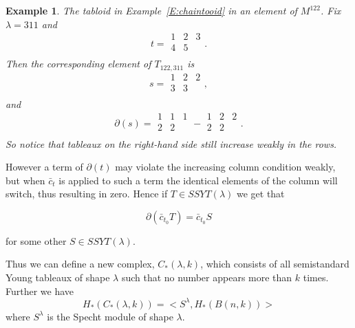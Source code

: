 \documentclass{elsart}
\newtheorem{example}[theorem]{Example}
\begin{document}
\begin{example}
  The tabloid in Example~\ref{E:chaintooid} in an element of $M^{122}$. Fix $\lambda=311$ and 
  $$t = \begin{array}{ccc} 1 & 2 & 3 \\ 4 & 5 & \\ \end{array} .$$ Then the corresponding element of $T_{122, 311}$ is
  $$s = \begin{array}{ccc} 1 & 2 & 2 \\ 3 & 3\\ \end{array} ,$$ and 
  $$\partial(s) = \begin{array}{ccc} 1 & 1 & 1\\ 2 & 2\\ \end{array}  - \begin{array}{ccc} 1 & 2 & 2 \\ 2 & 2\\ 
    \end{array} .$$
  So notice that tableaux on the right-hand side still increase weakly in the rows.
\end{example}

However a term of $\partial(t)$ may violate the
increasing column condition weakly, but when ${\bar c}_t$ is applied to such a term the 
identical elements of the column will switch, thus resulting in zero. Hence if $T \in SSYT(\lambda)$ we get that

$$\partial({\bar c}_{t_0} T) = {\bar c}_{t_0} S$$

for some other $S \in SSYT(\lambda)$.


Thus we can define a new complex, 
$C_*(\lambda, k)$,  which consists of 
all semistandard Young tableaux of shape $\lambda$ such that no number appears more than $k$ times. Further we have
$$H_*(C_*(\lambda, k)) = <S^\lambda, H_*(B(n, k))>$$ where $S^\lambda$ is the Specht module of shape $\lambda$. 
\end{document}
